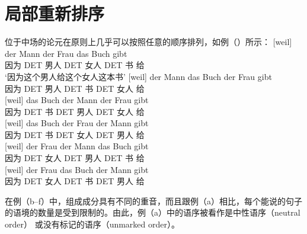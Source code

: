 \section{局部重新排序}
\label{sec-GB-lokale-Umstellung}

位于中场的论元在原则上几乎可以按照任意的顺序排列，如例（）所示：
\eal
\label{ex-gb-umstellung}
\ex 
\gll {}[weil] der Mann der Frau das Buch gibt\\
     \spacebr{}因为 DET 男人 DET 女人 DET 书 给\\
\glt `因为这个男人给这个女人这本书'
\ex 
\gll {}[weil] der Mann das Buch der Frau gibt\\
     \spacebr{}因为 DET 男人 DET 书 DET 女人 给\\
\ex\label{ex-das-buch-der-mann-der-frau-gibt} 
\gll {}[weil] das Buch der Mann der Frau gibt\\
     \spacebr{}因为 DET 书 DET 男人 DET 女人 给\\
\ex 
\gll {}[weil] das Buch der Frau der Mann gibt\\
     \spacebr{}因为 DET 书 DET 女人 DET 男人 给\\
\ex 
\gll {}[weil] der Frau der Mann das Buch gibt\\
     \spacebr{}因为 DET 女人 DET 男人 DET 书 给\\
\ex 
\gll {}[weil] der Frau das Buch der Mann gibt\\
     \spacebr{}因为 DET 女人 DET 书 DET 男人 给\\
\zl

\noindent
在例（b--f）中，组成成分具有不同的重音，而且跟例（a）相比，每个能说的句子的语境的数量是受到限制的\citep{Hoehle82}。由此，例（a）中的语序被看作是中性语序（neutral order） 或没有标记的语序（unmarked order）。

